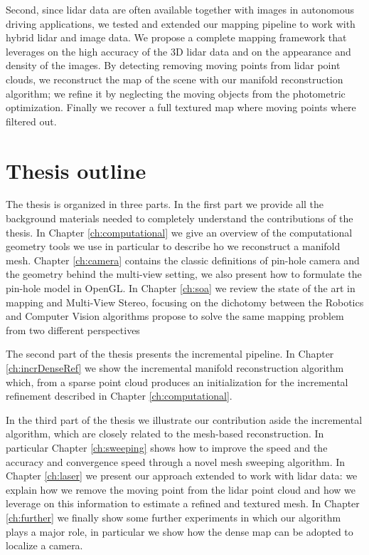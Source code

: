 Second, since lidar data are often available together with images in autonomous driving applications, we tested and extended our mapping pipeline to work with hybrid lidar and image data.
We propose a complete mapping framework  that leverages on the high accuracy of the 3D lidar data and on the appearance and density of the images.
By detecting removing moving points from lidar point clouds, we reconstruct the map of the scene with our manifold reconstruction algorithm; we refine it by neglecting the moving objects from the photometric optimization. Finally we recover a full textured map where moving points where filtered out.



\section{Thesis outline}

The thesis is organized in three parts. 
In the first part we provide all the background materials needed to completely understand the contributions of the thesis.
In Chapter \ref{ch:computational} we give an overview of the computational geometry tools we use in particular to describe ho we reconstruct a manifold mesh.  
Chapter \ref{ch:camera} contains the classic definitions of pin-hole camera and the geometry behind the  multi-view setting, we also present how to formulate the pin-hole model in OpenGL.
In Chapter \ref{ch:soa} we review the state of the art in mapping and Multi-View Stereo, focusing on the dichotomy between the Robotics and  Computer Vision algorithms propose to solve the same mapping problem from two different perspectives

The second part of the thesis presents the incremental pipeline. 
In Chapter \ref{ch:incrDenseRef} we show the incremental manifold reconstruction algorithm which, from a sparse point cloud produces an initialization for the incremental refinement described in  Chapter \ref{ch:computational}.

In the third part of the thesis we illustrate our contribution aside the incremental algorithm, which are closely related to the mesh-based reconstruction.
In particular Chapter \ref{ch:sweeping} shows how to improve the speed and the accuracy and convergence speed through a novel mesh sweeping algorithm.
In Chapter \ref{ch:laser} we present our approach extended to work with lidar data: we explain how we remove the moving point from the lidar point cloud and how we leverage on this information to estimate a refined and textured mesh.
In Chapter \ref{ch:further} we finally show some further experiments in which our algorithm plays a major role, in particular we show how the dense map can be adopted to localize a camera.














